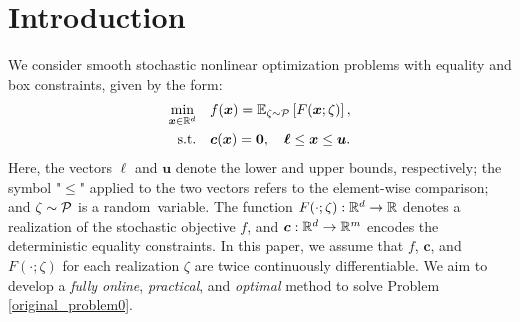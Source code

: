 \documentclass[aos]{imsart}
\numberwithin{equation}{section}
\theoremstyle{plain}
\begin{document}
\section{Introduction}

We consider smooth stochastic nonlinear optimization problems with equality and box constraints, given by the form:
\begin{equation}\label{original_problem0}
	\begin{split}
		\min_{\bm{x} \in \mathbb{R}^{d}} & \hspace{1em} f(\bm{x}) = \mathbb{E}_{\zeta \sim \P} \left[ F(\bm{x}; \zeta) \right], \\
		\text{s.t.} & \hspace{1em} \bm{c}(\bm{x}) = \bm{0},\quad \bm{\ell} \leq \bm{x} \leq \bm{u}.
	\end{split}
\end{equation}
Here, the vectors $\bm{\ell}$ and $\bm{u}$ denote the lower and upper bounds, respectively; the symbol "$\leq$" applied to the two vectors refers to the element-wise comparison; and $\zeta\sim\P$ is a random~variable. The function $F(\cdot; \zeta):\mR^d\rightarrow \mR$ denotes a realization of the stochastic objective $f$, and $\bm{c}:\mR^d\rightarrow\mR^m$ encodes the deterministic equality constraints. In this paper, we assume that $f$, $\bm{c}$, and $F(\cdot; \zeta)$ for each realization $\zeta$ are twice continuously differentiable. We aim to develop a \textit{fully online}, \textit{practical}, and \textit{optimal} method to solve Problem \eqref{original_problem0}.
\end{document}
